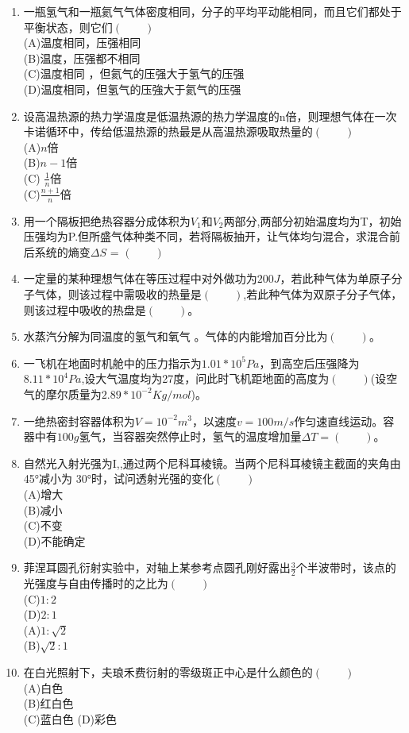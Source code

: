 \begin{enumerate}
\item 一瓶氢气和一瓶氦气气体密度相同，分子的平均平动能相同，而且它们都处于平衡状态，则它们$(\qquad)$\\
(A)温度相同，压强相同\\
(B)温度，压强都不相同\\
(C)温度相同 ，但氦气的压强大于氢气的压强\\
(D)温度相同，但氢气的压強大于氦气的压强
\item 设高温热源的热力学温度是低温热源的热力学温度的n倍，则理想气体在一次卡诺循环中，传给低温热源的热最是从高温热源吸取热量的$(\qquad)$\\
(A)$n$倍\\
(B)$n-1$倍\\
(C) $\frac{1}{n}$倍\\
(C)$\frac{n+1}{n}$倍
\item 用一个隔板把绝热容器分成体积为$V_1$和$V_2$两部分,两部分初始温度均为T，初始压强均为P.但所盛气体种类不同，若将隔板抽开，让气体均匀混合，求混合前后系统的熵变$\Delta S$ = $(\qquad)$
\item 一定量的某种理想气体在等压过程中对外做功为$200J$，若此种气体为单原子分子气体，则该过程中需吸收的热量是$(\qquad)$,若此种气体为双原子分子气体，则该过程中吸收的热盘是$(\qquad)$。
\item 水蒸汽分解为同温度的氢气和氧气 。气体的内能增加百分比为$(\qquad)$。
\item 一飞机在地面时机舱中的压力指示为$1.01*10^5 Pa$，到高空后压强降为$8.11*10^4 Pa$,设大气温度均为27度，问此时飞机距地面的高度为$(\qquad)$(设空气的摩尔质量为$2.89*10^{-2}Kg/mol$)。
\item 一绝热密封容器体积为$V=10^{-2}m^3$，以速度$v=100m/s$作匀速直线运动。容器中有$100g$氢气，当容器突然停止时，氢气的温度增加量$\Delta T=(\qquad)$。
\item 自然光入射光强为I,,通过两个尼科耳棱镜。当两个尼科耳棱镜主截面的夹角由 45°减小为 30°时，试问透射光强的变化$(\qquad)$\\
(A)增大\\
(B)减小\\
(C)不变\\
(D)不能确定
\item 菲涅耳圆孔衍射实验中，对轴上某参考点圆孔刚好露出$\frac{3}{2}$个半波带时，该点的光强度与自由传播时的之比为$(\qquad)$\\
(C)$1:2$\\
(D)$2:1$\\
(A)$1:\sqrt{2}$\\
(B)$\sqrt{2}:1$
\item 在白光照射下，夫琅禾费衍射的零级斑正中心是什么颜色的$(\qquad)$\\
(A)白色\\
(B)红白色\\
(C)蓝白色
(D)彩色
\end{enumerate}
